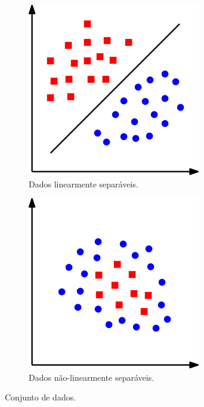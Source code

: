 \documentclass[12pt,a4paper]{scrartcl}
\theoremstyle{definition}%
\begin{document}
\begin{figure}[htbp] 
	\centering
	\begin{subfigure}[h]{0.30\textwidth}
		\centering
		\includegraphics[width=\textwidth]{dados_linearmente_separaveis}
		\caption{Dados linearmente separáveis. \label{fig:dados_linearmente_separaveis_e_nao_separaveis:a}}
	\end{subfigure}
	\begin{subfigure}[h]{0.30\textwidth}
		\centering
		\includegraphics[width=\textwidth]{dados_nao_linearmente_separaveis}
		\caption{Dados não-linearmente separáveis. \label{fig:dados_linearmente_separaveis_e_nao_separaveis:b}}
	\end{subfigure}
\caption{Conjunto de dados. \label{fig:dados_linearmente_separaveis_e_nao_separaveis} }
\end{figure}
\end{document}
